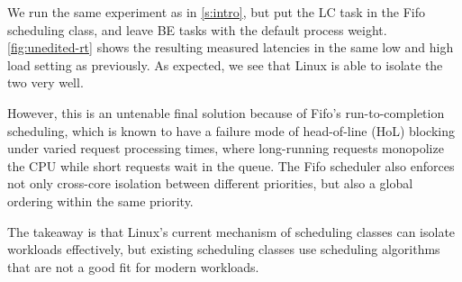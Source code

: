 We run the same experiment as in \autoref{s:intro}, but put the LC task in the
Fifo scheduling class, and leave BE tasks with the default process weight.
\autoref{fig:unedited-rt} shows the resulting measured latencies in the same low
and high load setting as previously. As expected, we see that Linux is able to
isolate the two very well. 

However, this is an untenable final solution because of Fifo's run-to-completion
scheduling, which is known to have a failure mode of head-of-line (HoL) blocking
under varied request processing times, where long-running requests monopolize
the CPU while short requests wait in the queue. The Fifo scheduler also enforces
not only cross-core isolation between different priorities, but also a global
ordering within the same priority.

The takeaway is that Linux's current mechanism of scheduling classes can isolate
workloads effectively, but existing scheduling classes use scheduling
algorithms that are not a good fit for modern workloads.



